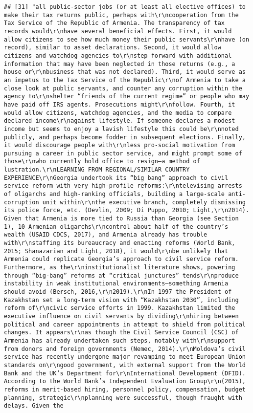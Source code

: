 \documentclass[
]{article}
\begin{document}
\begin{verbatim}
## [31] "all public-sector jobs (or at least all elective offices) to make their tax returns public, perhaps with\r\ncooperation from the Tax Service of the Republic of Armenia. The transparency of tax records would\r\nhave several beneficial effects. First, it would allow citizens to see how much money their public servants\r\nhave (on record), similar to asset declarations. Second, it would allow citizens and watchdog agencies to\r\nstep forward with additional information that may have been neglected in those returns (e.g., a house or\r\nbusiness that was not declared). Third, it would serve as an impetus to the Tax Service of the Republic\r\nof Armenia to take a close look at public servants, and counter any corruption within the agency to\r\nshelter “friends of the current regime” or people who may have paid off IRS agents. Prosecutions might\r\nfollow. Fourth, it would allow citizens, watchdog agencies, and the media to compare declared income\r\nagainst lifestyle. If someone declares a modest income but seems to enjoy a lavish lifestyle this could be\r\nnoted publicly, and perhaps become fodder in subsequent elections. Finally, it would discourage people with\r\nless pro-social motivation from pursuing a career in public sector service, and might prompt some of those\r\nwho currently hold office to resign—a method of lustration.\r\nLEARNING FROM REGIONAL/SIMILAR COUNTRY EXPERIENCE\r\nGeorgia undertook its “big bang” approach to civil service reform with very high-profile reforms:\r\ntelevising arrests of oligarchs and high-ranking officials, building a large-scale anti-corruption unit within\r\nthe executive branch, completely dismissing its police force, etc. (Devlin, 2009; Di Puppo, 2010; Light,\r\n2014). Given that Armenia is more tied to Russia than Georgia (see Section 1), 10 Armenian oligarchs\r\ncontrol about half of the country’s wealth (USAID CDCS, 2017), and Armenia already has trouble with\r\nstaffing its bureaucracy and enacting reforms (World Bank, 2015; Shanazarian and Light, 2018), it would\r\nbe unlikely that Armenia could replicate Georgia’s approach to civil service reform. Furthermore, as the\r\ninstitutionalist literature shows, powering through “big-bang” reforms at “critical junctures” tends\r\nproduce instability in weak institutional environments—something Armenia should avoid (Bersch, 2016,\r\n2019).\r\nIn 1997 the President of Kazakhstan set a long-term vision with “Kazakhstan 2030”, including reform of\r\ncivic service efforts in 1999. Kazakhstan limited the executive influence on civil servants by dividing\r\nhiring between political and career appointments in attempt to shield from political changes. It appears\r\nas though the Civil Service Council (CSC) of Armenia has already undertaken such steps, notably with\r\nsupport from donors and foreign governments (Nemec, 2014).\r\nMoldova’s civil service has recently undergone major revamping to meet European Union standards on\r\ngood government, with external support from the World Bank and the UK’s Department for\r\nInternational Development (DFID). According to the World Bank’s Independent Evaluation Group\r\n(2015), reforms in merit-based hiring, personnel policy, compensation, budget planning, strategic\r\nplanning were successful, though fraught with delays. Given the 
\end{verbatim}
\end{document}
